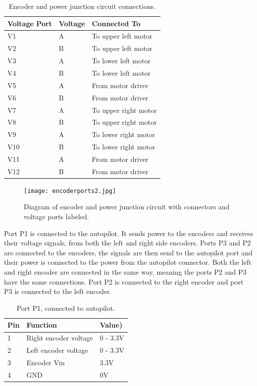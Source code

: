 \documentclass[letterpaper,12pt]{report}
\begin{document}
\begin{table}[h]
	\centering
	\begin{tabular}{| l | l | l |}
 		\hline
 		Voltage Port & Voltage & Connected To \\ \hline 
 		V1 & A  & To upper left motor \\ \hline
 		V2 & B & To upper left motor \\ \hline
 		V3 & A & To lower left motor \\ \hline
 		V4 & B & To lower left motor \\ \hline
 		V5 & A & From motor driver \\ \hline
 		V6 & B & From motor driver \\ \hline
 		V7 & A & To upper right motor \\ \hline
 		V8 & B & To upper right motor \\ \hline
 		V9 & A & To lower right motor\\ \hline
 		V10 & B & To lower right motor \\ \hline
 		V11 & A & From motor driver \\ \hline
 		V12 & B & From motor driver \\ \hline
	\end{tabular}
	\caption{Encoder and power junction circuit connections.}
\end{table}

\begin{figure}[h]
	\centering
	\texttt{[image: encoderports2.jpg]}
	\caption{Diagram of encoder and power junction circuit with connectors and voltage ports labeled.}
	\label{Figure 1:}
\end{figure}
Port P1 is connected to the autopilot. It sends power to the encoders and receives their voltage signals, from both the left and right side encoders. Ports P3 and P2 are connected to the encoders, the signals are then send to the autopilot port and their power is connected to the power from the autopilot connector. Both the left and right encoder are connected in the same way, meaning the ports P2 and P3 have the same connections. Port P2 is connected to the right encoder and port P3 is connected to the left encoder.
 
\begin{table}[h]
	\centering
	\begin{tabular}{| l | l | l |}
 		\hline
 		Pin & Function & Value) \\ \hline 
 		1 & Right encoder voltage & 0 - 3.3V \\ \hline
 		2 & Left encoder voltage & 0 - 3.3V \\ \hline
 		3 & Encoder Vin & 3.3V \\ \hline
 		4 & GND & 0V \\ \hline
	\end{tabular}
	\caption{Port P1, connected to autopilot.}
\end{table}
\end{document}
